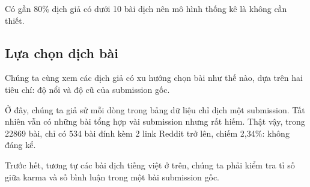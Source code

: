 \documentclass[10pt,a4paper]{article}
\begin{document}
Có gần 80\% dịch giả có dưới 10 bài dịch nên mô hình thống kê là không cần thiết.

\subsection{Lựa chọn dịch bài}
Chúng ta cùng xem các dịch giả có xu hướng chọn bài như thế nào, dựa trên hai tiêu chí: độ nổi và độ cũ của submission gốc.

Ở đây, chúng ta giả sử mỗi dòng trong bảng dữ liệu chỉ dịch một submission. Tất nhiên vẫn có những bài tổng hợp vài submission nhưng rất hiếm. Thật vậy, trong 22869 bài, chỉ có 534 bài đính kèm 2 link Reddit trở lên, chiếm 2,34\%: không đáng kể.

Trước hết, tương tự các bài dịch tiếng việt ở trên, chúng ta phải kiểm tra tỉ số giữa karma và số bình luận trong một bài submission gốc.
\end{document}
